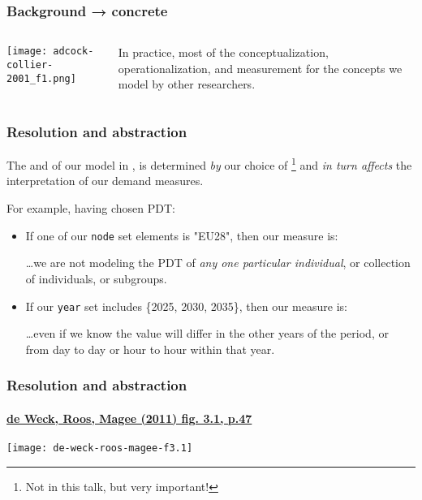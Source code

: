\documentclass[12pt,aspectratio=169]{beamer}
\begin{document}
\begin{frame}
\frametitle{Background → concrete}

\begin{columns}
\column{0.5\paperwidth}
\texttt{[image: adcock-collier-2001\_f1.png]}

\column{0.4\paperwidth}
{\small {}}

\medskip
In practice, most of the conceptualization, operationalization, and measurement for the concepts we model  by other researchers.
\end{columns}
\end{frame}

\begin{frame}
\frametitle{Resolution and abstraction}

The  and  of our model in ,  is determined \emph{by} our choice of \footnote{Not in this talk, but very important!} and \emph{in turn affects} the interpretation of our demand measures.

\bigskip
For example, having chosen PDT:
\begin{itemize}[<+(1)->]
  \item If one of our \texttt{node} set elements is "EU28", then our measure is:


  …we are not modeling the PDT of \emph{any one particular individual}, or collection of individuals, or subgroups.

  \item If our \texttt{year} set includes \{2025, 2030, 2035\}, then our measure is:


  …even if we know the value will differ in the other years of the period, or from day to day or hour to hour within that year.
\end{itemize}
\end{frame}

\begin{frame}
\frametitle{Resolution and abstraction}
\framesubtitle{\href{https://mitpress.mit.edu/books/engineering-systems}{de Weck, Roos, Magee (2011) fig. 3.1, p.47}}

\centering
\texttt{[image: de-weck-roos-magee-f3.1]}
\end{frame}
\end{document}
